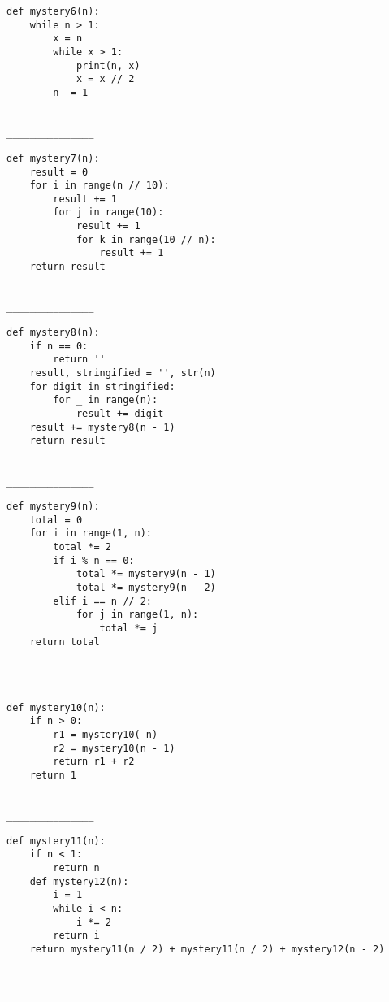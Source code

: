 \documentclass[twoside]{article}
\begin{document}
\begin{enumerate}
\begin{lstlisting}
def mystery6(n):
    while n > 1:
        x = n
        while x > 1:
            print(n, x)
            x = x // 2
        n -= 1
\end{lstlisting}
~\\
\lstinline{_______________}

\begin{lstlisting}
def mystery7(n):
    result = 0
    for i in range(n // 10):
        result += 1
        for j in range(10):
            result += 1
            for k in range(10 // n):
                result += 1
    return result
\end{lstlisting}
~\\
\lstinline{_______________}


\begin{lstlisting}
def mystery8(n):
    if n == 0:
        return ''
    result, stringified = '', str(n)
    for digit in stringified:
        for _ in range(n):
            result += digit
    result += mystery8(n - 1)
    return result
\end{lstlisting}
~\\
\lstinline{_______________}

\begin{lstlisting}
def mystery9(n):
    total = 0
    for i in range(1, n):
        total *= 2
        if i % n == 0:
            total *= mystery9(n - 1)
            total *= mystery9(n - 2)
        elif i == n // 2:
            for j in range(1, n):
                total *= j
    return total
\end{lstlisting}
~\\
\lstinline{_______________}

\newpage


\begin{lstlisting}
def mystery10(n):
    if n > 0:
        r1 = mystery10(-n)
        r2 = mystery10(n - 1)
        return r1 + r2
    return 1
\end{lstlisting}
~\\
\lstinline{_______________}

\begin{lstlisting}
def mystery11(n):
    if n < 1:
        return n
    def mystery12(n):
        i = 1
        while i < n:
            i *= 2
        return i
    return mystery11(n / 2) + mystery11(n / 2) + mystery12(n - 2)
\end{lstlisting}
~\\
\lstinline{_______________}


\end{enumerate}
\end{document}

